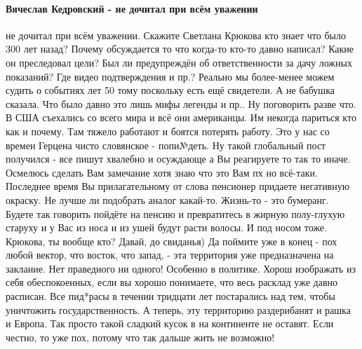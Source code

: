
%
\paragraph{Вячеслав Кедровский - не дочитал при всём уважении}
%

\begin{itemize}

не дочитал при всём уважении. Скажите Светлана Крюкова кто знает что было 300
лет назад? Почему обсуждается то что когда-то кто-то давно написал? Какие он
преследовал цели? Был ли предупреждён об ответственности за дачу ложных
показаний? Где видео подтверждения и пр.? Реально мы более-менее можем судить о
событиях лет 50 тому поскольку есть ещё свидетели. А не бабушка сказала. Что
было давно это лишь мифы легенды и пр.. Ну поговорить разве что. В США
съехались со всего мира и всё они американцы. Им некогда париться кто как и
почему. Там тяжело работают и боятся потерять работу. Это у нас со времен
Герцена чисто словянское - попи№деть. Ну такой глобальный пост получился - все
пишут хвалебно и осуждающе а Вы реагируете то так то иначе. Осмелюсь сделать
Вам замечание хотя знаю что это Вам пх но всё-таки. Последнее время Вы
прилагательному от слова пенсионер придаете негативную окраску. Не лучше ли
подобрать аналог какай-то. Жизнь-то - это бумеранг. Будете так говорить пойдёте
на пенсию и превратитесь в жирную полу-глухую старуху и у Вас из носа и из ушей
будут расти волосы. И под носом тоже.
Крюкова, ты вообще кто? Давай, до свиданья)
Да поймите уже в конец - пох любой вектор, что восток, что запад, - эта
территория уже предназначена на заклание. Нет праведного ни одного! Особенно в
политике. Хорош изображать из себя обеспокоенных, если вы хорошо понимаете, что
весь расклад уже давно расписан. Все пид*расы в течении тридцати лет
постарались над тем, чтобы уничтожить государственность. А теперь, эту
территорию раздерибанят и рашка и Европа. Так просто такой сладкий кусок в на
континенте не оставят. Если честно, то уже пох, потому что так дальше жить не
возможно!


\end{itemize}
